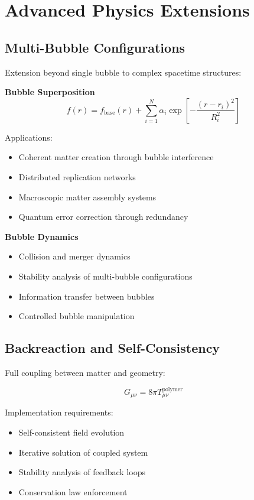 \documentclass[11pt]{article}
\begin{document}
\section{Advanced Physics Extensions}

\subsection{Multi-Bubble Configurations}

Extension beyond single bubble to complex spacetime structures:

\textbf{Bubble Superposition}
\begin{equation}
f(r) = f_{\text{base}}(r) + \sum_{i=1}^N \alpha_i \exp\left[-\frac{(r-r_i)^2}{R_i^2}\right]
\end{equation}

Applications:
\begin{itemize}
\item Coherent matter creation through bubble interference
\item Distributed replication networks
\item Macroscopic matter assembly systems
\item Quantum error correction through redundancy
\end{itemize}

\textbf{Bubble Dynamics}
\begin{itemize}
\item Collision and merger dynamics
\item Stability analysis of multi-bubble configurations
\item Information transfer between bubbles
\item Controlled bubble manipulation
\end{itemize}

\subsection{Backreaction and Self-Consistency}

Full coupling between matter and geometry:

\begin{equation}
G_{\mu\nu} = 8\pi T_{\mu\nu}^{\text{polymer}}
\end{equation}

Implementation requirements:
\begin{itemize}
\item Self-consistent field evolution
\item Iterative solution of coupled system
\item Stability analysis of feedback loops
\item Conservation law enforcement
\end{itemize}
\end{document}
